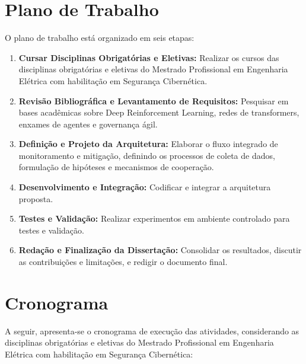 \documentclass[article,12pt,a4paper]{abntex2}
\begin{document}
\section{Plano de Trabalho}
O plano de trabalho está organizado em seis etapas:
\begin{enumerate}
	\item \textbf{Cursar Disciplinas Obrigatórias e Eletivas:} Realizar os cursos das disciplinas obrigatórias e eletivas do Mestrado Profissional em Engenharia Elétrica com habilitação em Segurança Cibernética.
    \item \textbf{Revisão Bibliográfica e Levantamento de Requisitos:} Pesquisar em bases acadêmicas sobre Deep Reinforcement Learning, redes de transformers, enxames de agentes e governança ágil.
    \item \textbf{Definição e Projeto da Arquitetura:} Elaborar o fluxo integrado de monitoramento e mitigação, definindo os processos de coleta de dados, formulação de hipóteses e mecanismos de cooperação.
    \item \textbf{Desenvolvimento e Integração:} Codificar e integrar a arquitetura proposta.
    \item \textbf{Testes e Validação:} Realizar experimentos em ambiente controlado para testes e validação.
    \item \textbf{Redação e Finalização da Dissertação:} Consolidar os resultados, discutir as contribuições e limitações, e redigir o documento final.
\end{enumerate}

\section{Cronograma}
A seguir, apresenta-se o cronograma de execução das atividades, considerando as disciplinas obrigatórias e eletivas do Mestrado Profissional em Engenharia Elétrica com habilitação em Segurança Cibernética:
\end{document}

